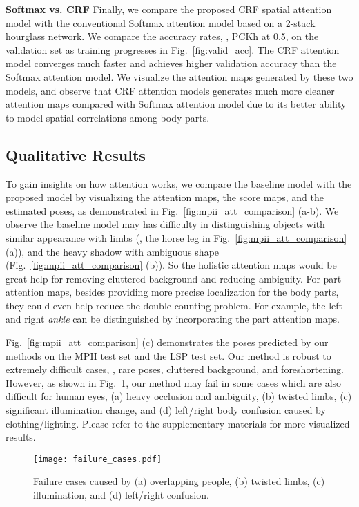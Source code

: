 \documentclass[10pt,twocolumn,letterpaper]{article}
\newcommand{\smalltitle}[1]{\vspace{0.2em}\noindent \textbf{{#1}}}
\begin{document}
\smalltitle{Softmax vs. CRF} Finally, we compare the proposed CRF spatial attention model with the conventional Softmax attention model based on a 2-stack hourglass network. We compare the accuracy rates, \ie, PCKh at 0.5, on the validation set as training progresses in Fig.~\ref{fig:valid_acc}. The CRF attention model converges much faster and achieves higher validation accuracy than the Softmax attention model. 
We visualize the attention maps generated by these two models, and observe that CRF attention models generates much more cleaner attention maps compared with Softmax attention model due to its better ability to model spatial correlations among body parts.

\subsection{Qualitative Results}
To gain insights on how attention works, we compare the baseline model with the proposed model by visualizing the attention maps, the score maps, and the estimated poses, as demonstrated in Fig.~\ref{fig:mpii_att_comparison} (a-b). 
We observe the baseline model may has difficulty in distinguishing objects with similar appearance with limbs (\eg, the horse leg in Fig.~\ref{fig:mpii_att_comparison} (a)), 
and the heavy shadow with ambiguous shape (Fig.~\ref{fig:mpii_att_comparison} (b)). 
So the holistic attention maps would be great help for removing cluttered background and reducing ambiguity. For part attention maps, besides providing more precise localization for the body parts, they could even help reduce the double counting problem. For example, the left and right \textit{ankle} can be distinguished by incorporating the part attention maps.


Fig.~\ref{fig:mpii_att_comparison} (c) demonstrates the poses predicted by our methods on the MPII test set and the LSP test set. Our method is robust to extremely difficult cases, \eg, rare poses, cluttered background, and foreshortening. 
However, as shown in Fig.~\ref{fig:failure_cases}, our method may fail in some cases which are also difficult for human eyes, \ie (a) heavy occlusion and ambiguity,  (b) twisted limbs,  (c) significant illumination change, and  (d) left/right body confusion caused by clothing/lighting. Please refer to the supplementary materials for more visualized results.








\begin{figure}
  	\begin{center}
	\texttt{[image: failure\_cases.pdf]}
  	\end{center}
  	\vspace{-2em}
    \caption{\small Failure cases caused by (a) overlapping people,  (b) twisted limbs,  (c) illumination, and  (d) left/right confusion.}
      	\vspace{-1.5em}
  	\label{fig:failure_cases}
\end{figure}
\end{document}
